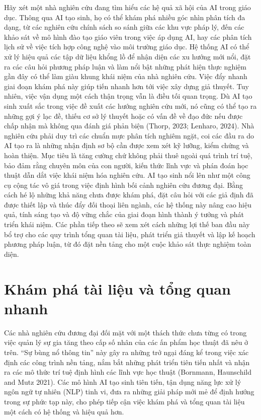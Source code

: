 Hãy xét một nhà nghiên cứu đang tìm hiểu các hệ quả xã hội của AI trong giáo dục. Thông qua AI tạo sinh, họ có thể khám phá nhiều góc nhìn phân tích đa dạng, từ các nghiên cứu chính sách so sánh giữa các khu vực pháp lý, đến các khảo sát về mô hình đào tạo giáo viên trong việc áp dụng AI, hay các phân tích lịch sử về việc tích hợp công nghệ vào môi trường giáo dục. Hệ thống AI có thể xử lý hiệu quả các tập dữ liệu khổng lồ để nhận diện các xu hướng mới nổi, đặt ra các câu hỏi phương pháp luận và làm nổi bật những phát hiện thực nghiệm gần đây có thể làm giàu khung khái niệm của nhà nghiên cứu. Việc đẩy nhanh giai đoạn khám phá này giúp tiến nhanh hơn tới việc xây dựng giả thuyết. Tuy nhiên, việc vận dụng một cách thận trọng vẫn là điều tối quan trọng. Dù AI tạo sinh xuất sắc trong việc đề xuất các hướng nghiên cứu mới, nó cũng có thể tạo ra những gợi ý lạc đề, thiếu cơ sở lý thuyết hoặc có vấn đề về đạo đức nếu được chấp nhận mà không qua đánh giá phản biện (Thorp, 2023; Lenharo, 2024). Nhà nghiên cứu phải duy trì các chuẩn mực phân tích nghiêm ngặt, coi các đầu ra do AI tạo ra là những nhận định sơ bộ cần được xem xét kỹ lưỡng, kiểm chứng và hoàn thiện. Mục tiêu là tăng cường chứ không phải thuê ngoài quá trình trí tuệ, bảo đảm rằng chuyên môn của con người, kiến thức lĩnh vực và phán đoán học thuật dẫn dắt việc khái niệm hóa nghiên cứu. AI tạo sinh nổi lên như một công cụ cộng tác vô giá trong việc định hình bối cảnh nghiên cứu đương đại. Bằng cách hé lộ những khả năng chưa được khám phá, đặt câu hỏi với các giả định đã được thiết lập và thúc đẩy đối thoại liên ngành, các hệ thống này nâng cao hiệu quả, tính sáng tạo và độ vững chắc của giai đoạn hình thành ý tưởng và phát triển khái niệm. Các phần tiếp theo sẽ xem xét cách những lợi thế ban đầu này bổ trợ cho các quy trình tổng quan tài liệu, phát triển giả thuyết và lập kế hoạch phương pháp luận, từ đó đặt nền tảng cho một cuộc khảo sát thực nghiệm toàn diện.

\section{Khám phá tài liệu và tổng quan nhanh}

Các nhà nghiên cứu đương đại đối mặt với một thách thức chưa từng có trong việc quản lý sự gia tăng theo cấp số nhân của các ấn phẩm học thuật đã nêu ở trên. ``Sự bùng nổ thông tin'' này gây ra những trở ngại đáng kể trong việc xác định các công trình nền tảng, nắm bắt những phát triển tiên tiến nhất và nhận ra các mô thức trí tuệ định hình các lĩnh vực học thuật (Bornmann, Haunschild and Mutz 2021). Các mô hình AI tạo sinh tiên tiến, tận dụng năng lực xử lý ngôn ngữ tự nhiên (NLP) tinh vi, đưa ra những giải pháp mới mẻ để định hướng trong sự phức tạp này, cho phép tiếp cận việc khám phá và tổng quan tài liệu một cách có hệ thống và hiệu quả hơn.

